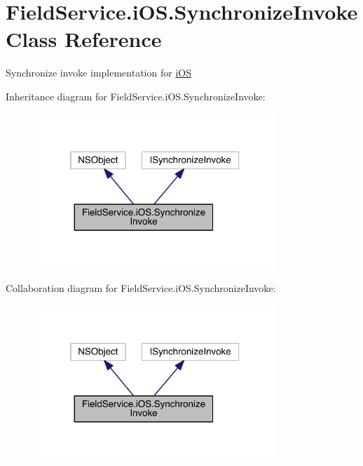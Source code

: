 \hypertarget{class_field_service_1_1i_o_s_1_1_synchronize_invoke}{\section{Field\+Service.\+i\+O\+S.\+Synchronize\+Invoke Class Reference}
\label{class_field_service_1_1i_o_s_1_1_synchronize_invoke}
}


Synchronize invoke implementation for \hyperlink{namespace_field_service_1_1i_o_s}{i\+O\+S}  




Inheritance diagram for Field\+Service.\+i\+O\+S.\+Synchronize\+Invoke\+:
\nopagebreak
\begin{figure}[H]
\begin{center}
\leavevmode
\includegraphics[width=259pt]{class_field_service_1_1i_o_s_1_1_synchronize_invoke__inherit__graph}
\end{center}
\end{figure}


Collaboration diagram for Field\+Service.\+i\+O\+S.\+Synchronize\+Invoke\+:
\nopagebreak
\begin{figure}[H]
\begin{center}
\leavevmode
\includegraphics[width=259pt]{class_field_service_1_1i_o_s_1_1_synchronize_invoke__coll__graph}
\end{center}
\end{figure}
